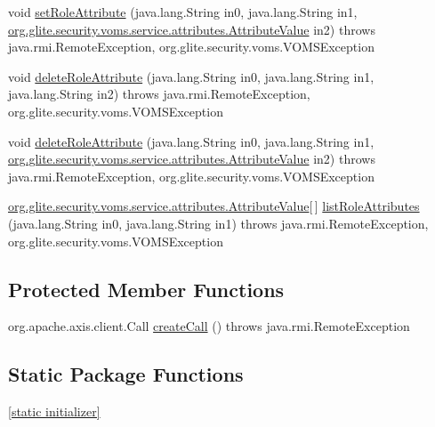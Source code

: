 \begin{DoxyCompactItemize}
\item 
void \hyperlink{classorg_1_1glite_1_1security_1_1voms_1_1service_1_1attributes_1_1VOMSAttributesSoapBindingStub_ad0b452ea90e5ff79e148652f5e81b53a}{setRoleAttribute} (java.lang.String in0, java.lang.String in1, \hyperlink{classorg_1_1glite_1_1security_1_1voms_1_1service_1_1attributes_1_1AttributeValue}{org.glite.security.voms.service.attributes.AttributeValue} in2)  throws java.rmi.RemoteException, org.glite.security.voms.VOMSException 
\item 
void \hyperlink{classorg_1_1glite_1_1security_1_1voms_1_1service_1_1attributes_1_1VOMSAttributesSoapBindingStub_a391eeaca32e878a88b5334a185e47985}{deleteRoleAttribute} (java.lang.String in0, java.lang.String in1, java.lang.String in2)  throws java.rmi.RemoteException, org.glite.security.voms.VOMSException 
\item 
void \hyperlink{classorg_1_1glite_1_1security_1_1voms_1_1service_1_1attributes_1_1VOMSAttributesSoapBindingStub_aecb679ce185fd894db417034434b18b1}{deleteRoleAttribute} (java.lang.String in0, java.lang.String in1, \hyperlink{classorg_1_1glite_1_1security_1_1voms_1_1service_1_1attributes_1_1AttributeValue}{org.glite.security.voms.service.attributes.AttributeValue} in2)  throws java.rmi.RemoteException, org.glite.security.voms.VOMSException 
\item 
\hyperlink{classorg_1_1glite_1_1security_1_1voms_1_1service_1_1attributes_1_1AttributeValue}{org.glite.security.voms.service.attributes.AttributeValue}\mbox{[}$\,$\mbox{]} \hyperlink{classorg_1_1glite_1_1security_1_1voms_1_1service_1_1attributes_1_1VOMSAttributesSoapBindingStub_a8a07a21c4ffedae5c50091836e1fd971}{listRoleAttributes} (java.lang.String in0, java.lang.String in1)  throws java.rmi.RemoteException, org.glite.security.voms.VOMSException 
\end{DoxyCompactItemize}
\subsection*{Protected Member Functions}
\begin{DoxyCompactItemize}
\item 
org.apache.axis.client.Call \hyperlink{classorg_1_1glite_1_1security_1_1voms_1_1service_1_1attributes_1_1VOMSAttributesSoapBindingStub_ae3360b55800beccdcd7f8022facc0256}{createCall} ()  throws java.rmi.RemoteException 
\end{DoxyCompactItemize}
\subsection*{Static Package Functions}
\begin{DoxyCompactItemize}
\item 
\hyperlink{classorg_1_1glite_1_1security_1_1voms_1_1service_1_1attributes_1_1VOMSAttributesSoapBindingStub_a56768068b8e2ad4dcdbcc918c8eefa12}{\mbox{[}static initializer\mbox{]}}
\end{DoxyCompactItemize}
